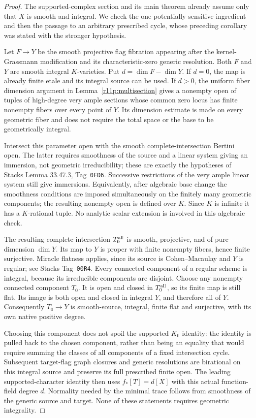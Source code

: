 \documentclass[11pt,a4paper]{article}
\theoremstyle{definition}
\theoremstyle{remark}
\begin{document}
\begin{proof}
The supported-complex section and its main theorem already assume
only that $X$ is smooth and integral.  We check the one potentially
sensitive ingredient and then the passage to an arbitrary prescribed
cycle, whose preceding corollary was stated with the stronger hypothesis.

Let $F\to Y$ be the smooth projective flag fibration appearing after
the kernel-Grassmann modification and its characteristic-zero generic
resolution.  Both $F$ and $Y$ are smooth integral $K$-varieties.
Put $d=\dim F-\dim Y$.  If $d=0$, the map is already finite etale
and its integral source can be used.  If $d>0$, the uniform fiber
dimension argument in Lemma~\ref{r11p:multisection} gives a nonempty open of tuples of
high-degree very ample sections whose common zero locus has finite
nonempty fibers over every point of $Y$.  Its dimension estimate is
made on every geometric fiber and does not require the total space
or the base to be geometrically integral.

Intersect this parameter open with the smooth complete-intersection
Bertini open.  The latter requires smoothness of the source and a
linear system giving an immersion, not geometric irreducibility;
these are exactly the hypotheses of Stacks Lemma 33.47.3,
Tag~\texttt{0FD6}.  Successive restrictions of the very ample linear
system still give immersions.  Equivalently, after algebraic base
change the smoothness conditions are imposed simultaneously on the
finitely many geometric components; the resulting nonempty open is
defined over $K$.  Since $K$ is infinite it has a $K$-rational tuple.
No analytic scalar extension is involved in this algebraic check.

The resulting complete intersection $T_0^{\rm all}$ is smooth,
projective, and of pure dimension $\dim Y$.  Its map to $Y$ is
proper with finite nonempty fibers, hence finite surjective.
Miracle flatness applies, since its source is Cohen--Macaulay and
$Y$ is regular; see Stacks Tag~\texttt{00R4}.
Every connected component of a regular scheme is integral, because
its irreducible components are disjoint.  Choose any nonempty
connected component $T_0$.  It is open and closed in
$T_0^{\rm all}$, so its finite map is still flat.  Its image is both
open and closed in integral $Y$, and therefore all of $Y$.
Consequently $T_0\to Y$ is smooth-source, integral, finite flat and
surjective, with its own native positive degree.

Choosing this component does not spoil the supported $K_0$ identity:
the identity is pulled back to the chosen component, rather than
being an equality that would require summing the classes of all
components of a fixed intersection cycle.  Subsequent target-flag
graph closures and generic resolutions are birational on this
integral source and preserve its full prescribed finite open.
The leading supported-character identity then uses
$f_*[T]=d[X]$ with this actual function-field degree $d$.
Normality needed by the minimal trace follows from smoothness of
the generic source and target.  None of these statements requires
geometric integrality.


\end{proof}
\end{document}
